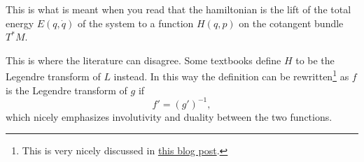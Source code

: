 \documentclass[english,fontsize=11pt,paper=a5,oneside]{scrbook}
\theoremstyle{definition}
\newenvironment{remark}
  {\pushQED{\qed}\renewcommand{\qedsymbol}{$\lozenge$}\remarkx}
  {\popQED\endremarkx}
\begin{document}
\begin{remark}
  This is what is meant when you read that the hamiltonian is the lift of the total energy $E(q, \dot q)$ of the system to a function $H(q,p)$ on the cotangent bundle $T^*M$.
\end{remark}

\begin{remark}
  This is where the literature can disagree. Some textbooks define $H$ to be the Legendre transform of $L$ instead. In this way the definition can be rewritten\footnote{This is very nicely discussed in \href{https://web.archive.org/web/20211114232435/https://blog.jessriedel.com/2017/06/28/legendre-transform/}{this blog post}.} as $f$ is the Legendre transform of $g$ if
  \begin{equation}
    f' = (g')^{-1}, 
  \end{equation}
  which nicely emphasizes involutivity and duality between the two functions.
\end{remark}
\end{document}
